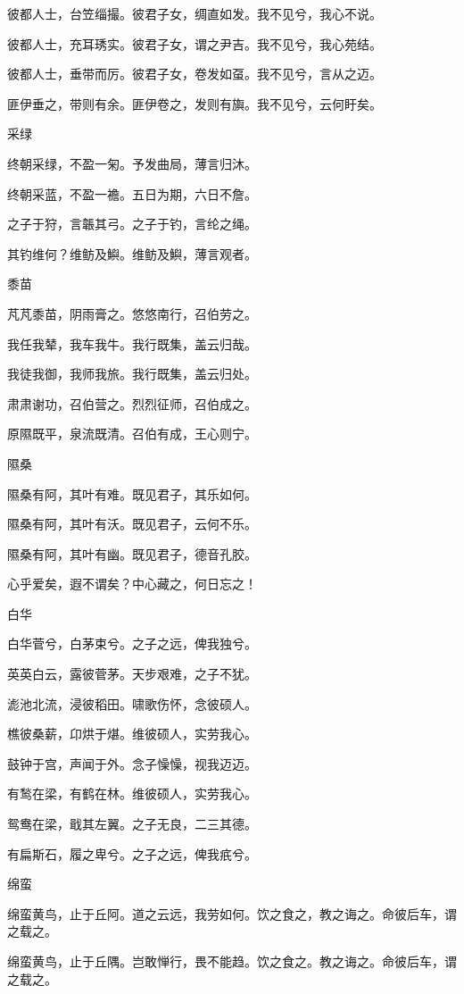 彼都人士，台笠缁撮。彼君子女，绸直如发。我不见兮，我心不说。

彼都人士，充耳琇实。彼君子女，谓之尹吉。我不见兮，我心苑结。

彼都人士，垂带而厉。彼君子女，卷发如虿。我不见兮，言从之迈。

匪伊垂之，带则有余。匪伊卷之，发则有旟。我不见兮，云何盱矣。

采绿

终朝采绿，不盈一匊。予发曲局，薄言归沐。

终朝采蓝，不盈一襜。五日为期，六日不詹。

之子于狩，言韔其弓。之子于钓，言纶之绳。

其钓维何？维鲂及鱮。维鲂及鱮，薄言观者。

黍苗

芃芃黍苗，阴雨膏之。悠悠南行，召伯劳之。

我任我辇，我车我牛。我行既集，盖云归哉。

我徒我御，我师我旅。我行既集，盖云归处。

肃肃谢功，召伯营之。烈烈征师，召伯成之。

原隰既平，泉流既清。召伯有成，王心则宁。

隰桑

隰桑有阿，其叶有难。既见君子，其乐如何。

隰桑有阿，其叶有沃。既见君子，云何不乐。

隰桑有阿，其叶有幽。既见君子，德音孔胶。

心乎爱矣，遐不谓矣？中心藏之，何日忘之！

白华

白华菅兮，白茅束兮。之子之远，俾我独兮。

英英白云，露彼菅茅。天步艰难，之子不犹。

滮池北流，浸彼稻田。啸歌伤怀，念彼硕人。

樵彼桑薪，卬烘于煁。维彼硕人，实劳我心。

鼓钟于宫，声闻于外。念子懆懆，视我迈迈。

有鹙在梁，有鹤在林。维彼硕人，实劳我心。

鸳鸯在梁，戢其左翼。之子无良，二三其德。

有扁斯石，履之卑兮。之子之远，俾我疧兮。

绵蛮

绵蛮黄鸟，止于丘阿。道之云远，我劳如何。饮之食之，教之诲之。命彼后车，谓之载之。

绵蛮黄鸟，止于丘隅。岂敢惮行，畏不能趋。饮之食之。教之诲之。命彼后车，谓之载之。

